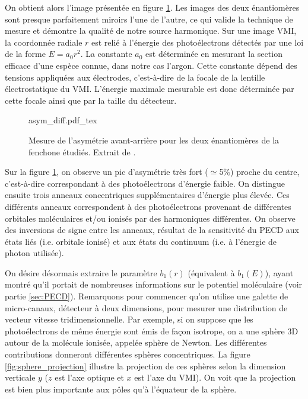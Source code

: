 On obtient alors l'image présentée en figure \ref{fig:asym_diff}. Les images des deux énantiomères sont presque parfaitement miroirs l'une de l'autre, ce qui valide la technique de mesure et démontre la qualité de notre source harmonique. Sur une image VMI, la coordonnée radiale $r$ est relié à l'énergie des photoélectrons détectés par une loi de la forme $E = a_0 r^2$. La constante $a_0$ est déterminée en mesurant la section efficace d'une espèce connue, dans notre cas l'argon. Cette constante dépend des tensions appliquées aux électrodes, c'est-à-dire de la focale de la lentille électrostatique du VMI. L'énergie maximale mesurable est donc déterminée par cette focale ainsi que par la taille du détecteur. 

\begin{figure}[!ht]
\centering
\def\svgwidth{0.8\columnwidth}
{asym_diff.pdf_tex}
\caption{Mesure de l'asymétrie avant-arrière pour les deux énantiomères de la fenchone étudiés. Extrait de .}
\label{fig:asym_diff}
\end{figure}

Sur la figure \ref{fig:asym_diff}, on observe un pic d'asymétrie très fort ($\simeq$5\%) proche du centre, c'est-à-dire correspondant à des photoélectrons d'énergie faible. On distingue ensuite trois anneaux concentriques supplémentaires d'énergie plus élevée. Ces différents anneaux correspondent à des photoélectrons provenant de différentes orbitales moléculaires et/ou ionisés par des harmoniques différentes. On observe des inversions de signe entre les anneaux, résultat de la sensitivité du PECD aux états liés (i.e. orbitale ionisé) et aux états du continuum (i.e. à l'énergie de photon utilisée). 

On désire désormais extraire le paramètre $b_1(r)$ (équivalent à $b_1(E)$), ayant montré qu'il portait de nombreuses informations sur le potentiel moléculaire (voir partie \ref{sec:PECD}). Remarquons pour commencer qu'on utilise une galette de micro-canaux, détecteur à deux dimensions, pour mesurer une distribution de vecteur vitesse tridimensionnelle. Par exemple, si on suppose que les photoélectrons de même énergie sont émis de façon isotrope, on a une sphère 3D autour de la molécule ionisée, appelée sphère de Newton. Les différentes contributions donneront différentes sphères concentriques. La figure \ref{fig:sphere_projection} illustre la projection de ces sphères selon la dimension verticale $y$ ($z$ est l'axe optique et $x$ est l'axe du VMI). On voit que la projection est bien plus importante aux pôles qu'à l'équateur de la sphère. 

